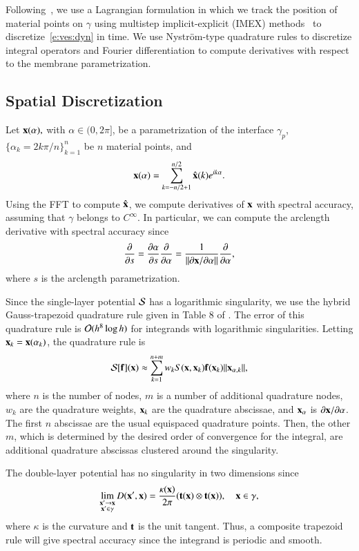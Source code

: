 Following~\cite{rah:vee:bir}, we use a Lagrangian formulation in which
we track the position of material points on $\gamma$ using multistep
implicit-explicit (IMEX) methods~\cite{ascher1995} to
discretize~\eqref{e:ves:dyn} in time. We use Nystr\"{o}m-type
quadrature rules to discretize integral operators and Fourier
differentiation to compute derivatives with respect to the membrane
parametrization.

\subsection{Spatial Discretization\label{s:spaceDisc}} 
Let ${\mathbf{x}}(\alpha),$ with $\alpha \in (0,2\pi]$, be a parametrization of
the interface $\gamma_p$, $\{\alpha_k = 2k\pi/n\}_{k=1}^n$ be $n$
material points, and
\begin{align*}
  {\mathbf{x}}(\alpha) = \sum_{k = -n/2+1}^{n/2} \hat{{\mathbf{x}}}(k) e^{ik\alpha}.
\end{align*}
Using the FFT to compute $\hat{{\mathbf{x}}}$, we compute derivatives of ${\mathbf{x}}$
with spectral accuracy, assuming that $\gamma$ belongs to $C^{\infty}$.
In particular, we can compute the arclength derivative with spectral
accuracy since 
\begin{align*}
  \frac{\partial }{\partial s} = \frac{\partial \alpha}{\partial s}\frac{\partial }{\partial \alpha} = 
    \frac{1}{\|\partial{\mathbf{x}}/\partial\alpha\|}\frac{\partial }{\partial \alpha},
\end{align*}
where $s$ is the arclength parametrization.

Since the single-layer potential ${\mathcal{S}}$ has a logarithmic singularity, we
use the hybrid Gauss-trapezoid quadrature rule given in Table 8 of
\cite{alpert1999}.  The error of this quadrature rule is $\mathcal{O}(h^{8}
\log h)$ for integrands with logarithmic singularities. Letting ${\mathbf{x}}_k =
{\mathbf{x}}(\alpha_k)$, the quadrature rule is
\begin{align*}
  \mathcal S[{\mathbf{f}}]({\mathbf{x}}) \approx \sum_{k=1}^{n+m} w_{k}
      S({\mathbf{x}},{\mathbf{x}}_{k}) {\mathbf{f}}({\mathbf{x}}_{k})\| {\mathbf{x}}_{\alpha,k}\|,
\end{align*}
where $n$ is the number of nodes, $m$ is a number of additional
quadrature nodes, $w_{k}$ are the quadrature weights, ${\mathbf{x}}_{k}$ are the
quadrature abscissae, and ${\mathbf{x}}_{\alpha}$ is $\partial {\mathbf{x}}/\partial
\alpha$.  The first $n$ abscissae are the usual equispaced quadrature
points.  Then, the other $m$, which is determined by the desired order
of convergence for the integral, are additional quadrature abscissas
clustered around the singularity.

The double-layer potential has no singularity in two dimensions since
\begin{align*}
  \lim_{\substack{{\mathbf{x}}' \to {\mathbf{x}} \\ {\mathbf{x}}' \in \gamma}} D({\mathbf{x}}',{\mathbf{x}}) = 
    \frac{\kappa({\mathbf{x}})}{2\pi}({\bf t}({\mathbf{x}}) \otimes {\bf t}({\mathbf{x}})),
  \quad {\mathbf{x}} \in \gamma,
\end{align*}
where $\kappa$ is the curvature and ${\bf t}$ is the unit tangent.
Thus, a composite trapezoid rule will give spectral accuracy since the
integrand is periodic and smooth.


